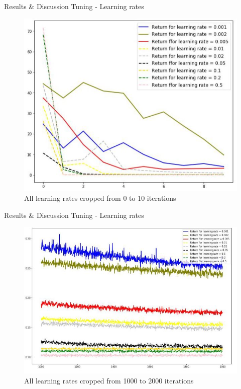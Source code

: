 \documentclass{beamer}
\begin{document}
\begin{frame}{Results \& Discussion }{Tuning - Learning rates\vphantom{(y}}
\vspace{-0.7em}
\begin{figure}
  \includegraphics[scale=0.5]{images/lr_cropped_0_10.JPG}
  \caption{All learning rates cropped from 0 to 10 iterations}
\end{figure}
\end{frame}

\begin{frame}{Results \& Discussion }{Tuning - Learning rates\vphantom{(y}}
\vspace{-0.7em}
\begin{figure}
  \includegraphics[scale=0.5]{images/lr_cropped_end.JPG}
  \caption{All learning rates cropped from 1000 to 2000 iterations}
\end{figure}
\end{frame}
\end{document}
